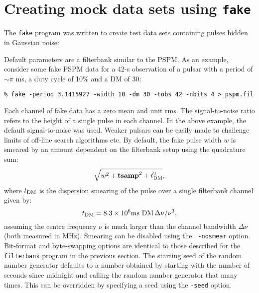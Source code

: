\documentclass[11pt]{article}
\begin{document}
\clearpage
\section{Creating mock data sets using {\tt fake}}

The {\tt fake} program was written to create test data sets containing
pulses hidden in Gaussian noise:
\label{fake}

Default parameters are a filterbank similar to the PSPM. As an example, 
consider some fake PSPM data for a 42-s observation of a
pulsar with a period of $\sim\pi$ ms, a duty cycle of 10\% and a DM of 30:
\begin{verbatim}
% fake -period 3.1415927 -width 10 -dm 30 -tobs 42 -nbits 4 > pspm.fil
\end{verbatim}
Each channel of fake data has a zero mean and unit rms.  The
signal-to-noise ratio refers to the height of a single pulse in each
channel. In the above example, the default signal-to-noise was
used. Weaker pulsars can be easily made to challenge limits of
off-line search algorithms etc. By default, the fake pulse width $w$
is smeared by an amount dependent on the filterbank setup using the
quadrature sum:
\begin{displaymath}
	\sqrt{w^2 + {\rm \bf tsamp}^2 + t_{\rm DM}^2},
\end{displaymath}
where $t_{\rm DM}$ is the dispersion smearing of the pulse over a
single filterbank channel given by:
\begin{displaymath}
 t_{\rm DM} = 8.3 \times 10^6 {\rm ms} \, \, {\rm DM} \, \Delta \nu / \nu^3,
\end{displaymath}
assuming the centre frequency $\nu$ is much larger than the channel bandwidth
$\Delta \nu$ (both measured in MHz). Smearing can be disabled using the {\tt
-nosmear} option. Bit-format and byte-swapping options are identical
to those described for the {\tt filterbank} program in the previous
section. The starting seed of the random number generator defaults to
a number obtained by starting with the number of seconds since midnight
and calling the random number generator that many times. This can be 
overridden by specifying a seed using the {\tt -seed} option. 
\end{document}
